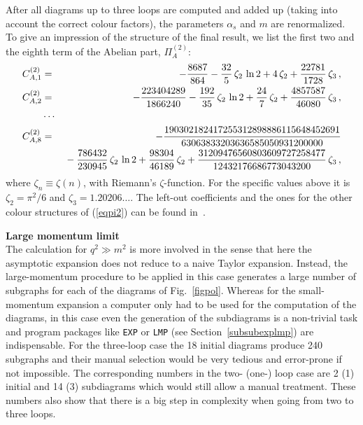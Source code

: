 After all diagrams up to three loops are computed and added up (taking
into account the correct colour factors), the parameters $\alpha_s$ and
$m$ are renormalized. To give an impression of the structure of
the final result, we list the first two and the eighth term of the
Abelian part, $\Pi_A^{(2)}$:
\begin{eqnarray}
   C^{(2)}_{A,1} &=&
          - {8687\over 864}
          - {32\over 5}\,\zeta_2\,\ln 2
          + 4\,\zeta_2
          + {22781\over 1728}\,\zeta_3\,,
\nonumber\\
   C^{(2)}_{A,2} &=&
          - {223404289\over 1866240}
          - {192\over 35}\,\zeta_2\,\ln 2
          + {24\over 7}\,\zeta_2
          + {4857587\over 46080}\,\zeta_3\,,
\label{eq::pfcn}
\\
&\cdots&
\nonumber\\
   C^{(2)}_{A,8} &=&
          - {190302182417255312898886115648452691\over 
             63063833203636585050931200000}
\nonumber\\
&&\mbox{}
          - {786432\over 230945}\,\zeta_2\,\ln 2
          + {98304\over 46189}\,\zeta_2
          + {31209476560803609727258477\over 12432176686773043200}\,\zeta_3
\nonumber
\,,
\end{eqnarray}
where $\zeta_n \equiv \zeta(n)$, with Riemann's $\zeta$-function. For
the specific values above it is $\zeta_2 = \pi^2/6$ and $\zeta_3 =
1.20206\ldots$.  The left-out coefficients and the ones for the other
colour structures of (\ref{eqpi2}) can be found in~\cite{CheKueSte96}.

%
\vspace{4ex}\noindent
{\bf Large momentum limit}\\[2ex]
%
The calculation for $q^2\gg m^2$ is more involved in the sense that
here the asymptotic expansion does not reduce to a naive Taylor
expansion.  Instead, the large-momentum procedure to be applied in this
case generates a large number of subgraphs for each of the diagrams of
Fig.~\ref{figpol}. Whereas for the small-momentum expansion a computer
only had to be used for the computation of the diagrams, in this
case even the generation of the subdiagrams is a non-trivial task and
program packages like {\tt EXP} or {\tt LMP} (see
Section~\ref{subsubexplmp}) are indispensable.
For the three-loop case the 18 initial diagrams produce 240 subgraphs
and their manual selection would be very tedious and error-prone if not
impossible.  The corresponding numbers in the two- (one-) loop case are
2 (1) initial and 14 (3) subdiagrams which would still allow a manual
treatment.  These numbers also show that there is a big step in
complexity when going from two to three loops.

